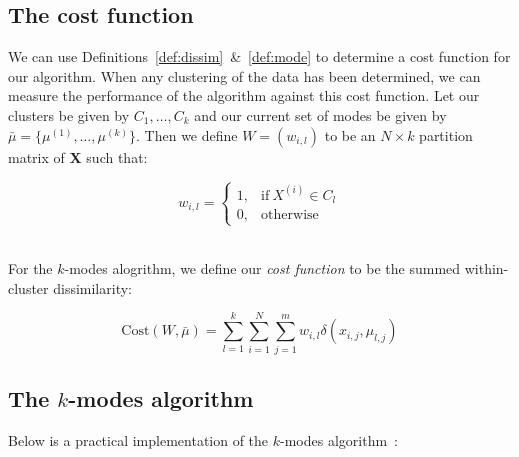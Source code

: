 \subsection{The cost function}\label{subsec:cost}

We can use Definitions~\ref{def:dissim}~\&~\ref{def:mode} to determine a cost 
function for our algorithm. When any clustering of the data has been determined,
we can measure the performance of the algorithm against this cost function. Let
our clusters be given by \(C_1, \ldots, C_k\) and our current set of modes be
given by \(\bar{\mu} = \{\mu^{(1)}, \ldots, \mu^{(k)}\}\). Then we define \(W =
(w_{i, l})\) to be an \(N \times k\) partition matrix of \textbf{X} such that:

\[ 
    w_{i,l} = \begin{cases}
                1, & \text{if} \ X^{(i)} \in C_l \\
                0, & \text{otherwise}
              \end{cases}
\]\\

\begin{definition}\label{def:cost}
    For the \(k\)-modes alogrithm, we define our \emph{cost function} to be the 
    summed within-cluster dissimilarity:

    \[
        \text{Cost}(W, \bar{\mu}) = \sum_{l=1}^{k} \sum_{i=1}^{N} \sum_{j=1}^{m}
        w_{i,l} \delta(x_{i,j}, \mu_{l,j})
    \]
\end{definition}


\subsection{The \(k\)-modes algorithm}\label{subsec:kmodes}

Below is a practical implementation of the \(k\)-modes algorithm~\cite{Huang98}:

